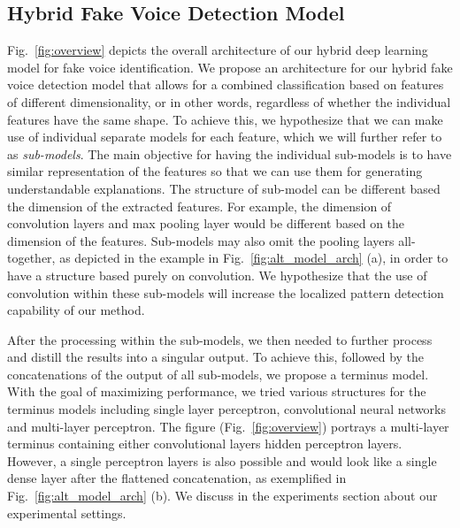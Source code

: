 \documentclass{article}
\begin{document}
\subsection{Hybrid Fake Voice Detection Model} \label{sec:method_arch}

Fig.~\ref{fig:overview} depicts the overall architecture of our hybrid deep learning model for fake voice identification. We propose an architecture for our hybrid fake voice detection model that allows for a combined classification based on features of different dimensionality, or in other words, regardless of whether the individual features have the same shape. To achieve this, we hypothesize that we can make use of individual separate models for each feature, which we will further refer to as \textit{sub-models}. The main objective for having the individual sub-models is to have similar representation of the features so that we can use them for generating understandable explanations. The structure of sub-model can be different based the dimension of the extracted features. For example, the dimension of convolution layers and max pooling layer would be different based on the dimension of the features. Sub-models may also omit the pooling layers all-together, as depicted in the example in Fig.~\ref{fig:alt_model_arch} (a), in order to have a structure based purely on convolution. We hypothesize that the use of convolution within these sub-models will increase the localized pattern detection capability of our method.

After the processing within the sub-models, we then needed to further process and distill the results into a singular output. To achieve this, followed by the concatenations of the output of all sub-models, we propose a terminus model. With the goal of maximizing performance, we tried various structures for the terminus models including single layer perceptron, convolutional neural networks and multi-layer perceptron. The figure (Fig.~\ref{fig:overview}) portrays a multi-layer terminus containing either convolutional layers hidden perceptron layers. However, a single perceptron layers is also possible and would look like a single dense layer after the flattened concatenation, as exemplified in Fig.~\ref{fig:alt_model_arch} (b). We discuss in the experiments section about our experimental settings.
\end{document}
